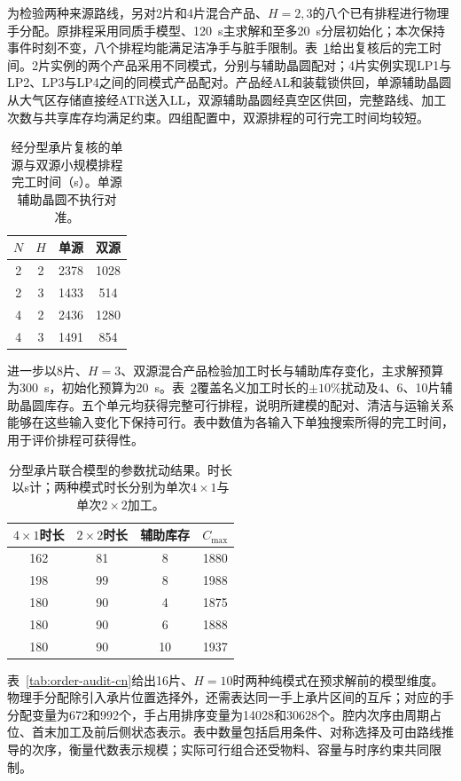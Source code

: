 \documentclass[final,5p,times,twocolumn]{elsarticle}
\begin{document}
为检验两种来源路线，另对2片和4片混合产品、$H=2,3$的八个已有排程进行物理手分配。原排程采用同质手模型、120~s主求解和至多20~s分层初始化；本次保持事件时刻不变，八个排程均能满足洁净手与脏手限制。表~\ref{tab:joint-source-cn}给出复核后的完工时间。2片实例的两个产品采用不同模式，分别与辅助晶圆配对；4片实例实现LP1与LP2、LP3与LP4之间的同模式产品配对。产品经AL和装载锁供回，单源辅助晶圆从大气区存储直接经ATR送入LL，双源辅助晶圆经真空区供回，完整路线、加工次数与共享库存均满足约束。四组配置中，双源排程的可行完工时间均较短。

\begin{table}[!t]\centering\scriptsize\setlength{\tabcolsep}{4pt}
\caption{经分型承片复核的单源与双源小规模排程完工时间（s）。单源辅助晶圆不执行对准。}
\label{tab:joint-source-cn}
\begin{tabular}{cccc}\toprule
$N$ & $H$ & 单源 & 双源\\\midrule
2 & 2 & 2378 & 1028\\
2 & 3 & 1433 & 514\\
4 & 2 & 2436 & 1280\\
4 & 3 & 1491 & 854\\
\bottomrule\end{tabular}\end{table}

进一步以8片、$H=3$、双源混合产品检验加工时长与辅助库存变化，主求解预算为300~s，初始化预算为20~s。表~\ref{tab:joint-perturb-cn}覆盖名义加工时长的$\pm10\%$扰动及4、6、10片辅助晶圆库存。五个单元均获得完整可行排程，说明所建模的配对、清洁与运输关系能够在这些输入变化下保持可行。表中数值为各输入下单独搜索所得的完工时间，用于评价排程可获得性。

\begin{table}[!t]\centering\scriptsize\setlength{\tabcolsep}{4pt}
\caption{分型承片联合模型的参数扰动结果。时长以s计；两种模式时长分别为单次$4\times1$与单次$2\times2$加工。}
\label{tab:joint-perturb-cn}
\begin{tabular}{cccc}\toprule
$4\times1$时长 & $2\times2$时长 & 辅助库存 & $C_{\max}$\\\midrule
162 & 81 & 8 & 1880\\
198 & 99 & 8 & 1988\\
180 & 90 & 4 & 1875\\
180 & 90 & 6 & 1888\\
180 & 90 & 10 & 1937\\
\bottomrule\end{tabular}\end{table}

表~\ref{tab:order-audit-cn}给出16片、$H=10$时两种纯模式在预求解前的模型维度。物理手分配除引入承片位置选择外，还需表达同一手上承片区间的互斥；对应的手分配变量为672和992个，手占用排序变量为14028和30628个。腔内次序由周期占位、首末加工及前后侧状态表示。表中数量包括启用条件、对称选择及可由路线推导的次序，衡量代数表示规模；实际可行组合还受物料、容量与时序约束共同限制。
\end{document}
